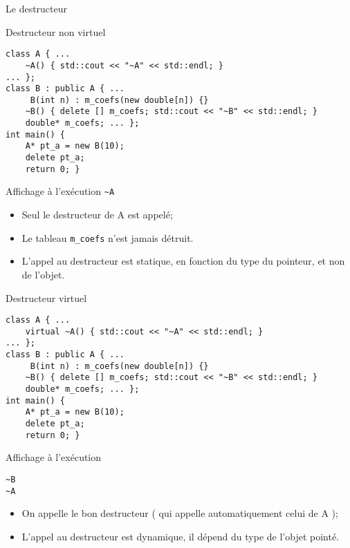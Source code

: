 \documentclass[handout,10pt]{beamer}
\begin{document}
\begin{frame}[fragile]{Le destructeur}
\tiny
\begin{block}{Destructeur non virtuel}
\begin{minipage}{0.48\textwidth}
\begin{lstlisting}
class A { ...
    ~A() { std::cout << "~A" << std::endl; }
... };
class B : public A { ...
     B(int n) : m_coefs(new double[n]) {}
    ~B() { delete [] m_coefs; std::cout << "~B" << std::endl; }
    double* m_coefs; ... };
int main() {
    A* pt_a = new B(10);
    delete pt_a;
    return 0; }
\end{lstlisting}
\end{minipage}\hfill
\begin{minipage}{0.48\textwidth}
\begin{block}{Affichage à l'exécution}
\lstinline$~A$
\begin{itemize}
\item Seul le destructeur de A est appelé;
\item Le tableau \lstinline$m_coefs$ n'est jamais détruit. 
\item L'appel au destructeur est statique, en fonction du type du pointeur, et non de l'objet.
\end{itemize}
\end{block}
\end{minipage}
\end{block}

\begin{block}{Destructeur virtuel}
\begin{minipage}{0.48\textwidth}
\begin{lstlisting}
class A { ...
    virtual ~A() { std::cout << "~A" << std::endl; }
... };
class B : public A { ...
     B(int n) : m_coefs(new double[n]) {}
    ~B() { delete [] m_coefs; std::cout << "~B" << std::endl; }
    double* m_coefs; ... };
int main() {
    A* pt_a = new B(10);
    delete pt_a;
    return 0; }
\end{lstlisting}
\end{minipage}\hfill
\begin{minipage}{0.48\textwidth}
\begin{block}{Affichage à l'exécution}
\begin{verbatim}
~B
~A
\end{verbatim}
\begin{itemize}
\item On appelle le bon destructeur ( qui appelle automatiquement celui de A );
\item L'appel au destructeur est dynamique, il dépend du type de l'objet pointé.
\end{itemize}
\end{block}
\end{minipage}
\end{block}
\end{frame}
\end{document}
